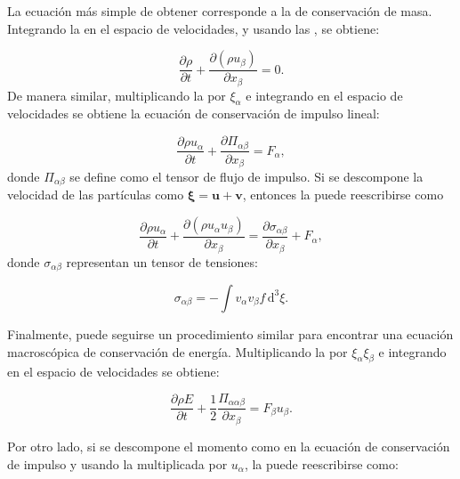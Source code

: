 La ecuaci\'on m\'as simple de obtener corresponde a la de conservaci\'on de masa. Integrando la  en el espacio de velocidades, y usando las , se obtiene:

\begin{equation}
	\dfrac{\partial \rho}{\partial t} + \dfrac{\partial (\rho u_{\beta})}{\partial x_{\beta}} = 0.
\end{equation}
De manera similar, multiplicando la  por $\xi_{\alpha}$ e integrando en el espacio de velocidades se obtiene la ecuaci\'on de conservaci\'on de impulso lineal:

\begin{equation}
	\dfrac{\partial \rho u_{\alpha}}{\partial t} + \dfrac{\partial \Pi_{\alpha \beta}}{\partial x_{\beta}} = F_{\alpha},
	\label{eq:mom_flux}
\end{equation}
donde $\Pi_{\alpha \beta}$ se define como el tensor de flujo de impulso. Si se descompone la velocidad de las part\'iculas como $\bm{\xi} = \bm{u} + \bm{v}$, entonces la  puede reescribirse como

\begin{equation}
	\dfrac{\partial \rho u_{\alpha}}{\partial t} 
	+ \dfrac{\partial (\rho u_{\alpha} u_{\beta})}{\partial x_{\beta}} = 
	\dfrac{\partial \sigma_{\alpha \beta}}{\partial x_{\beta}} + F_{\alpha},
	\label{eq:impulso}
\end{equation}
donde $\sigma_{\alpha \beta}$ representan un tensor de tensiones:

\begin{equation}
	\sigma_{\alpha \beta} = -\int v_{\alpha} v_{\beta} f \, \mbox{d}^3 \xi.
\end{equation}

Finalmente, puede seguirse un procedimiento similar para encontrar una ecuaci\'on macrosc\'opica de conservaci\'on de energ\'ia. Multiplicando la  por $\xi_{\alpha} \xi_{\beta}$ e integrando en el espacio de velocidades se obtiene:

\begin{equation}
	\dfrac{\partial \rho E}{\partial t} + \dfrac{1}{2} \dfrac{\Pi_{\alpha\alpha\beta}}{\partial x_{\beta}} = F_{\beta} u_{\beta}.
	\label{eq:energy_flux}
\end{equation}

Por otro lado,  si se descompone el momento como en la ecuaci\'on de conservaci\'on de impulso y usando la  multiplicada por $u_{\alpha}$, la  puede reescribirse como:

